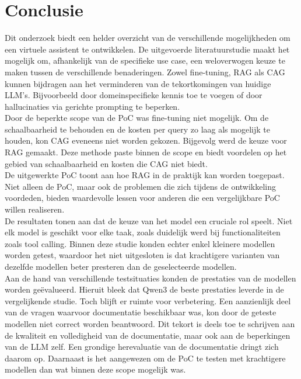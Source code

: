 
\chapter{Conclusie}%
\label{ch:conclusie}

Dit onderzoek biedt een helder overzicht van de verschillende mogelijkheden om een virtuele assistent te ontwikkelen. De uitgevoerde literatuurstudie maakt het mogelijk om, afhankelijk van de specifieke use case, een weloverwogen keuze te maken tussen de verschillende benaderingen. Zowel fine-tuning, RAG als CAG kunnen bijdragen aan het verminderen van de tekortkomingen van huidige LLM's. Bijvoorbeeld door domeinspecifieke kennis toe te voegen of door hallucinaties via gerichte prompting te beperken.
\\[1em]
Door de beperkte scope van de PoC was fine-tuning niet mogelijk. Om de schaalbaarheid te behouden en de kosten per query zo laag als mogelijk te houden, kon CAG eveneens niet worden gekozen. Bijgevolg werd de keuze voor RAG gemaakt. Deze methode paste binnen de scope en biedt voordelen op het gebied van schaalbaarheid en kosten die CAG niet biedt.
\\[1em]
De uitgewerkte PoC toont aan hoe RAG in de praktijk kan worden toegepast. Niet alleen de PoC, maar ook de problemen die zich tijdens de ontwikkeling voordeden, bieden waardevolle lessen voor anderen die een vergelijkbare PoC willen realiseren.
\\[1em]
De resultaten tonen aan dat de keuze van het model een cruciale rol speelt. Niet elk model is geschikt voor elke taak, zoals duidelijk werd bij functionaliteiten zoals tool calling. Binnen deze studie konden echter enkel kleinere modellen worden getest, waardoor het niet uitgesloten is dat krachtigere varianten van dezelfde modellen beter presteren dan de geselecteerde modellen.
\\[1em]
Aan de hand van verschillende testsituaties konden de prestaties van de modellen worden geëvalueerd. Hieruit bleek dat Qwen3 de beste prestaties leverde in de vergelijkende studie. Toch blijft er ruimte voor verbetering. Een aanzienlijk deel van de vragen waarvoor documentatie beschikbaar was, kon door de geteste modellen niet correct worden beantwoord. Dit tekort is deels toe te schrijven aan de kwaliteit en volledigheid van de documentatie, maar ook aan de beperkingen van de LLM zelf. Een grondige herevaluatie van de documentatie dringt zich daarom op. Daarnaast is het aangewezen om de PoC te testen met krachtigere modellen dan wat binnen deze scope mogelijk was.
